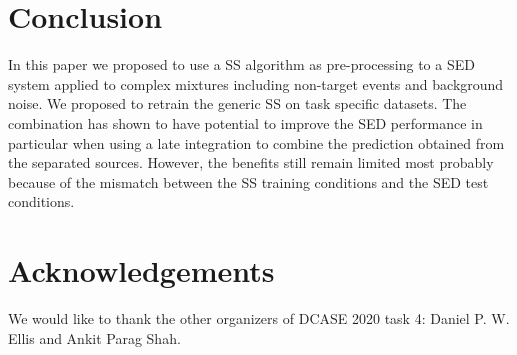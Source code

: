 \documentclass{article}
\begin{document}
\begin{sloppy}
\section{Conclusion}
\label{sec:conc}
In this paper we proposed to use a SS algorithm as pre-processing to a SED system applied to complex mixtures including non-target events and background noise. We proposed to retrain the generic SS on task specific datasets. The combination has shown to have potential to improve the SED performance in particular when using a late integration to combine the prediction obtained from the separated sources. However, the benefits still remain limited most probably because of the mismatch between the SS training conditions and the SED test conditions.

\section{Acknowledgements}
We would like to thank the other organizers of DCASE 2020 task 4: Daniel P. W. Ellis and Ankit Parag Shah.





\end{sloppy}
\end{document}
